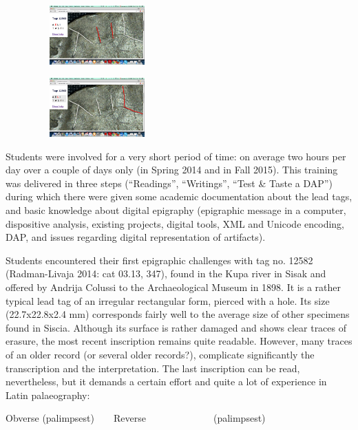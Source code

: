 \documentclass[amsthm,ebook]{saparticle}
\begin{document}
\begin{figure}
\centering
\includegraphics[width=4.941cm,height=2.281cm]{EAGLE16lameetalteaching-img003.png}
\end{figure}
\begin{figure}
\centering
\includegraphics[width=4.941cm,height=2.281cm]{EAGLE16lameetalteaching-img004.png}
\end{figure}
Students were involved for a very short period of time: on average two hours per day over a couple of days only (in
Spring 2014 and in Fall 2015). This training was delivered in three steps (``Readings'', ``Writings'', ``Test \& Taste a
DAP'') during which there were given some academic documentation about the lead tags, and basic knowledge about digital
epigraphy (epigraphic message in a computer, dispositive analysis, existing projects, digital tools, XML and Unicode
encoding, DAP, and issues regarding digital representation of artifacts).

Students encountered their first epigraphic challenges with tag no. 12582 (Radman-Livaja 2014: cat 03.13, 347), found in
the Kupa river in Sisak and offered by Andrija Colussi to the Archaeological Museum in 1898. It is a rather typical
lead tag of an irregular rectangular form, pierced with a hole. Its size (22.7x22.8x2.4 mm) corresponds fairly well to
the average size of other specimens found in Siscia. Although its surface is rather damaged and shows clear traces of
erasure, the most recent inscription remains quite readable. However, many traces of an older record (or several older
records?), complicate significantly the transcription and the interpretation. The last inscription can be read,
nevertheless, but it demands a certain effort and quite a lot of experience in Latin palaeography:

Obverse (palimpsest)\ \ \ \ Reverse\ \  \ \ \ \ \ \ \ \ \ \ \ \ (palimpsest)
\end{document}
